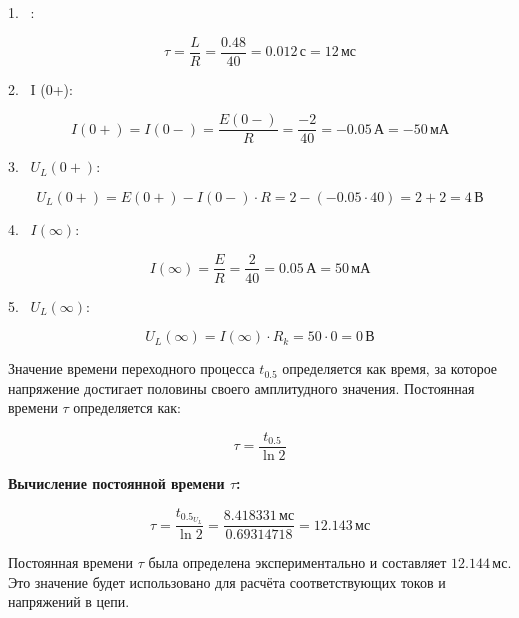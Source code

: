 1. \,  \tau:

\[
	\tau = \frac{L}{R} = \frac{0.48}{40} = 0.012 \, \text{с} = 12 \, \text{мс}
\]

2. \,  I (0+):

\[
	I(0+) = I(0-) = \frac{E(0-)}{R} = \frac{-2}{40} = -0.05 \, \text{А} = - 50 \, \text{мА}
\]

3. \,  $U_L(0+)$:

\[
	U_L(0+) = E(0+) - I(0-) \cdot R = 2 - (-0.05 \cdot 40) = 2 + 2 = 4 \, \text{В}
\]

4. \,  $I(\infty)$:

\[
	I(\infty) = \frac{E}{R} = \frac{2}{40} = 0.05 \, \text{А} = 50 \, \text{мА}
\]

5. \,  $U_L(\infty)$:

\[
	U_L(\infty) = I(\infty) \cdot R_k = 50 \cdot 0 = 0 \, \text{В}
\]

Значение времени переходного процесса \( t_{0.5} \) определяется как время, за которое напряжение достигает половины своего амплитудного значения. Постоянная времени \( \tau \) определяется как:

\[
	\tau = \frac{t_{0.5}}{\ln 2}
\]

\textbf{Вычисление постоянной времени \( \tau \):}

\[
	\tau = \frac{t_{0.5_{U_L}}}{\ln 2} = \frac{8.418331 \, \text{мс}}{0.69314718} = 12.143 \, \text{мс}
\]


Постоянная времени \( \tau \) была определена экспериментально и составляет
\( 12.144 \, \text{мс} \). Это значение будет использовано для расчёта соответствующих токов и напряжений в цепи.
